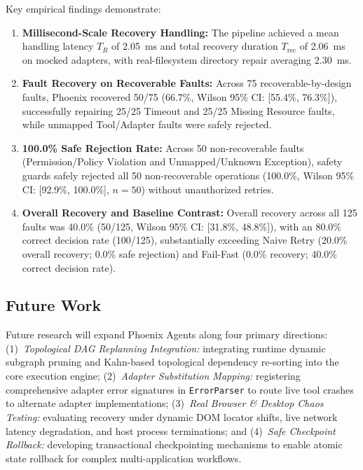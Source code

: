 \documentclass[conference]{IEEEtran}
\begin{document}
Key empirical findings demonstrate:
\begin{enumerate}
    \item \textbf{Millisecond-Scale Recovery Handling:} The pipeline achieved a mean handling latency $T_R$ of 2.05~ms and total recovery duration $T_{\text{rec}}$ of 2.06~ms on mocked adapters, with real-filesystem directory repair averaging 2.30~ms.
    \item \textbf{Fault Recovery on Recoverable Faults:} Across 75 recoverable-by-design faults, Phoenix recovered 50/75 (66.7\%, Wilson 95\% CI: [55.4\%, 76.3\%]), successfully repairing 25/25 Timeout and 25/25 Missing Resource faults, while unmapped Tool/Adapter faults were safely rejected.
    \item \textbf{100.0\% Safe Rejection Rate:} Across 50 non-recoverable faults (Permission/Policy Violation and Unmapped/Unknown Exception), safety guards safely rejected all 50 non-recoverable operations (100.0\%, Wilson 95\% CI: [92.9\%, 100.0\%], $n=50$) without unauthorized retries.
    \item \textbf{Overall Recovery and Baseline Contrast:} Overall recovery across all 125 faults was 40.0\% (50/125, Wilson 95\% CI: [31.8\%, 48.8\%]), with an 80.0\% correct decision rate (100/125), substantially exceeding Naive Retry (20.0\% overall recovery; 0.0\% safe rejection) and Fail-Fast (0.0\% recovery; 40.0\% correct decision rate).
\end{enumerate}

\subsection{Future Work}
Future research will expand Phoenix Agents along four primary directions:
(1)~\textit{Topological DAG Replanning Integration:} integrating runtime dynamic subgraph pruning and Kahn-based topological dependency re-sorting into the core execution engine;
(2)~\textit{Adapter Substitution Mapping:} registering comprehensive adapter error signatures in \texttt{ErrorParser} to route live tool crashes to alternate adapter implementations;
(3)~\textit{Real Browser \& Desktop Chaos Testing:} evaluating recovery under dynamic DOM locator shifts, live network latency degradation, and host process terminations; and
(4)~\textit{Safe Checkpoint Rollback:} developing transactional checkpointing mechanisms to enable atomic state rollback for complex multi-application workflows.
\end{document}
